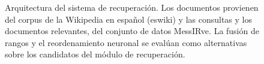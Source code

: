 \begin{figure}[tbp]
	\centering
	
	\caption{Arquitectura del sistema de recuperación. Los documentos provienen del corpus de la Wikipedia en español (eswiki) y las consultas y los documentos relevantes, del conjunto de datos MessIRve. La fusión de rangos y el reordenamiento neuronal se evalúan como alternativas sobre los candidatos del módulo de recuperación.}
	\label{fig:pipeline}
\end{figure}


